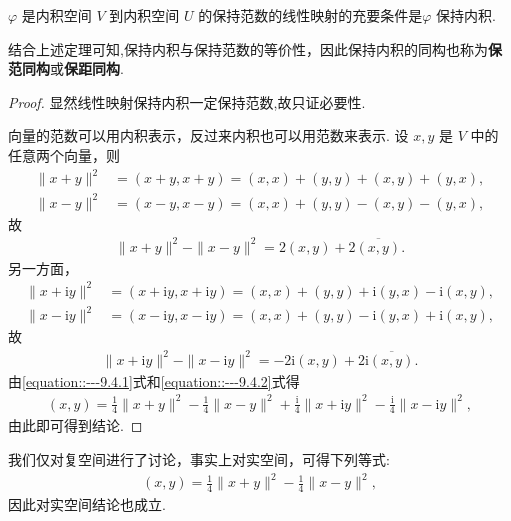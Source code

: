\documentclass[../../main.tex]{subfiles}%
\begin{document}
\begin{theorem}\label{theorem:保范线性映射一定保持内积}
$\varphi$ 是内积空间 $V$ 到内积空间 $U$ 的保持范数的线性映射的充要条件是$\varphi$ 保持内积.
\end{theorem}
\begin{remark}
结合上述定理可知,保持内积与保持范数的等价性，因此保持内积的同构也称为\textbf{保范同构}或\textbf{保距同构}. 
\end{remark}
\begin{proof}

显然线性映射保持内积一定保持范数,故只证必要性.

向量的范数可以用内积表示，反过来内积也可以用范数来表示. 设 $x,y$ 是 $V$ 中的任意两个向量，则
\begin{align*}
\|x + y\|^2&=(x + y,x + y)=(x,x)+(y,y)+(x,y)+(y,x),\\
\|x - y\|^2&=(x - y,x - y)=(x,x)+(y,y)-(x,y)-(y,x),
\end{align*}
故
\begin{align}
\|x + y\|^2 - \|x - y\|^2 = 2(x,y) + 2\overline{(x,y)}.\label{equation::---9.4.1}
\end{align}
另一方面，
\begin{align*}
\|x + \mathrm{i}y\|^2&=(x + \mathrm{i}y,x + \mathrm{i}y)=(x,x)+(y,y)+\mathrm{i}(y,x)-\mathrm{i}(x,y),\\
\|x - \mathrm{i}y\|^2&=(x - \mathrm{i}y,x - \mathrm{i}y)=(x,x)+(y,y)-\mathrm{i}(y,x)+\mathrm{i}(x,y),
\end{align*}
故
\begin{align}
\|x + \mathrm{i}y\|^2 - \|x - \mathrm{i}y\|^2 = -2\mathrm{i}(x,y) + 2\mathrm{i}\overline{(x,y)}.\label{equation::---9.4.2}
\end{align}
由\eqref{equation::---9.4.1}式和\eqref{equation::---9.4.2}式得
\begin{align*}
(x,y) = \frac{1}{4}\|x + y\|^2 - \frac{1}{4}\|x - y\|^2 + \frac{\mathrm{i}}{4}\|x + \mathrm{i}y\|^2 - \frac{\mathrm{i}}{4}\|x - \mathrm{i}y\|^2,
\end{align*}
由此即可得到结论.

\end{proof}
\begin{remark}
我们仅对复空间进行了讨论，事实上对实空间，可得下列等式:
\begin{align*}
(x,y) = \frac{1}{4}\|x + y\|^2 - \frac{1}{4}\|x - y\|^2,
\end{align*}
因此对实空间结论也成立. 
\end{remark}
\end{document}
